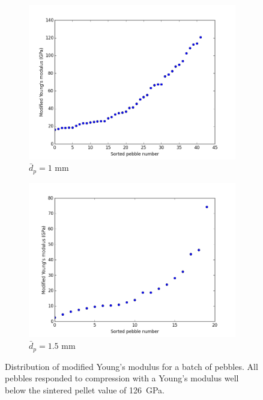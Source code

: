 \begin{figure}
        \centering
        \begin{subfigure}[b]{\imagewidth}
                \includegraphics[width=\textwidth]{chapters/figures/nfri-1mm-E-plot.png}
                \caption{$\bar{d}_p = 1$ mm}
                \label{fig:nfri-1mm-E-plot}
        \end{subfigure}

        \begin{subfigure}[b]{\imagewidth}
                \includegraphics[width=\textwidth]{chapters/figures/nfri-1.5mm-E-plot.png}
                \caption{$\bar{d}_p = 1.5$ mm}
                \label{fig:nfri-1.5mm-E-plot}
        \end{subfigure}
        \caption{Distribution of modified Young's modulus for a batch of \lit pebbles. All pebbles responded to compression with a Young's modulus well below the sintered pellet value of \si{126 GPa}.}\label{fig:nfri-E-plot}
\end{figure}


